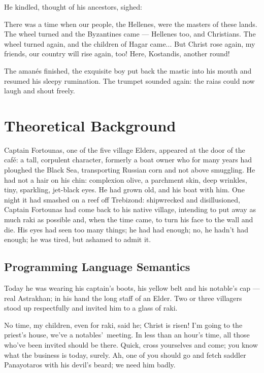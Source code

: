 \documentclass[diploma]{softlab-thesis}
\begin{document}
He kindled, thought of his ancestors, sighed:

There was a time when our people, the Hellenes, were the masters of these
lands. The wheel turned and the Byzantines came --- Hellenes too, and
Christians. The wheel turned again, and the children of Hagar came... But
Christ rose again, my friends, our country will rise again, too! Here,
Kostandis, another round!

The amanés finished, the exquisite boy put back the mastic into his mouth
and resumed his sleepy rumination. The trumpet sounded again: the raias
could now laugh and shout freely.


\chapter{Theoretical Background}

Captain Fortounas, one of the five village Elders, appeared at the door of
the café: a tall, corpulent character, formerly a boat owner who for many
years had ploughed the Black Sea, transporting Russian corn and not above
smuggling. He had not a hair on his chin: complexion olive, a parchment
skin, deep wrinkles, tiny, sparkling, jet-black eyes. He had grown old, and
his boat with him. One night it had smashed on a reef off Trebizond:
shipwrecked and disillusioned, Captain Fortounas had come back to his native
village, intending to put away as much raki as possible and, when the time
came, to turn his face to the wall and die. His eyes had seen too many
things; he had had enough; no, he hadn’t had enough; he was tired, but
ashamed to admit it.


\section{Programming Language Semantics}

Today he was wearing his captain’s boots, his yellow belt and his notable’s
cap --- real Astrakhan; in his hand the long staff of an Elder. Two or three
villagers stood up respectfully and invited him to a glass of raki.

No time, my children, even for raki, said he; Christ is risen! I’m going to
the priest’s house, we’ve a notables’~meeting. In less than an hour’s time,
all those who’ve been invited should be there. Quick, cross yourselves and
come; you know what the business is today, surely. Ah, one of you should go
and fetch saddler Panayotaros with his devil’s beard; we need him badly.
\end{document}
